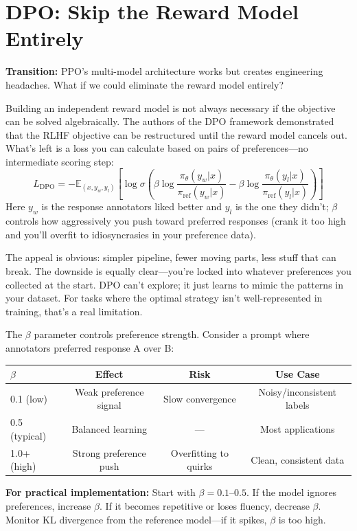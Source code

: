 \documentclass[12pt,a4paper]{report}
\theoremstyle{definition}
\begin{document}
\section{DPO: Skip the Reward Model Entirely}
\label{sec:dpo}
\textbf{Transition:} PPO's multi-model architecture works but creates engineering headaches. What if we could eliminate the reward model entirely?

Building an independent reward model is not always necessary if the objective can be solved algebraically. The authors of the DPO framework \cite{rafailov2023direct} demonstrated that the RLHF objective can be restructured until the reward model cancels out. What's left is a loss you can calculate based on pairs of preferences---no intermediate scoring step:
\begin{equation}
L_{\text{DPO}} = -\mathbb{E}_{(x,y_w,y_l)} \left[ \log \sigma \left( \beta \log \frac{\pi_\theta(y_w|x)}{\pi_{\text{ref}}(y_w|x)} - \beta \log \frac{\pi_\theta(y_l|x)}{\pi_{\text{ref}}(y_l|x)} \right) \right]
\end{equation}
Here $y_w$ is the response annotators liked better and $y_l$ is the one they didn't; $\beta$ controls how aggressively you push toward preferred responses (crank it too high and you'll overfit to idiosyncrasies in your preference data).

The appeal is obvious: simpler pipeline, fewer moving parts, less stuff that can break. The downside is equally clear---you're locked into whatever preferences you collected at the start. DPO can't explore; it just learns to mimic the patterns in your dataset. For tasks where the optimal strategy isn't well-represented in training, that's a real limitation.

\begin{tcolorbox}[colback=gray!5!white, colframe=gray!60!black, title=\textbf{Worked Example: DPO $\beta$ Parameter Tuning}]
\small
The $\beta$ parameter controls preference strength. Consider a prompt where annotators preferred response A over B:

\begin{center}
\begin{tabular}{lccc}
\toprule
$\beta$ & \textbf{Effect} & \textbf{Risk} & \textbf{Use Case} \\
\midrule
0.1 (low) & Weak preference signal & Slow convergence & Noisy/inconsistent labels \\
0.5 (typical) & Balanced learning & --- & Most applications \\
1.0+ (high) & Strong preference push & Overfitting to quirks & Clean, consistent data \\
\bottomrule
\end{tabular}
\end{center}

\textbf{For practical implementation:} Start with $\beta = 0.1$--$0.5$.
 If the model ignores preferences, increase $\beta$. If it becomes repetitive or loses fluency, decrease $\beta$. Monitor KL divergence from the reference model---if it spikes, $\beta$ is too high.
\end{tcolorbox}
\end{document}
